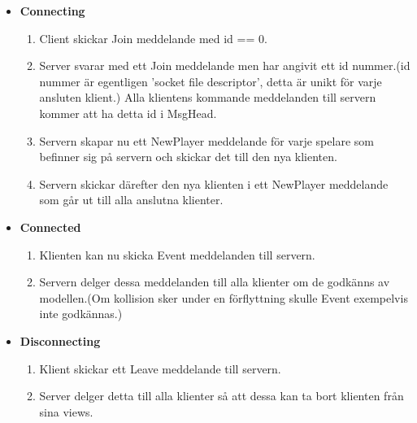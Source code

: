 \documentclass[10pt, titlepage, oneside, a4paper]{article}
\begin{document}
    	\begin{itemize}
    		\item\textbf{Connecting}
    		\begin{enumerate}
    			\item Client skickar Join meddelande med id == 0.
    			\item Server svarar med ett Join meddelande men har angivit ett id nummer.(id nummer är egentligen 'socket file descriptor', detta är unikt för varje ansluten klient.) Alla klientens kommande meddelanden till servern kommer att ha detta id i MsgHead.
    			\item Servern skapar nu ett NewPlayer meddelande för varje spelare som befinner sig på servern och skickar det till den nya klienten.
    			\item Servern skickar därefter den nya klienten i ett NewPlayer meddelande som går ut till alla anslutna klienter.
    		\end{enumerate}
    		
    		\item\textbf{Connected}
    		\begin{enumerate}
    			\item Klienten kan nu skicka Event meddelanden till servern.
    			\item Servern delger dessa meddelanden till alla klienter om de godkänns av modellen.(Om kollision sker under en förflyttning skulle Event exempelvis inte godkännas.)
    		\end{enumerate}
    		\item\textbf{Disconnecting}
    		\begin{enumerate}
    			\item Klient skickar ett Leave meddelande till servern.
    			\item Server delger detta till alla klienter så att dessa kan ta bort klienten från sina views.
    		\end{enumerate}
    	\end{itemize}
    	
\end{document}
